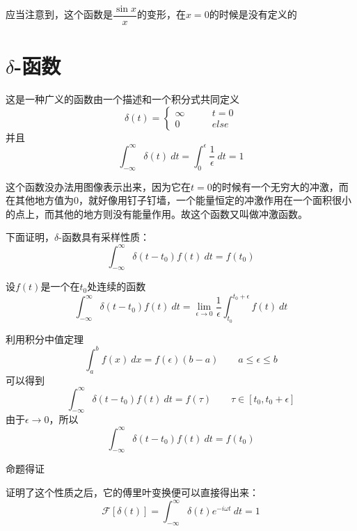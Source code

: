 \documentclass[UTF8]{ctexbook}
\begin{document}
			应当注意到，这个函数是$\dfrac{\sin x}{x}$的变形，在$x=0$的时候是没有定义的

		\section{$\delta$-函数}

			这是一种广义的函数由一个描述和一个积分式共同定义
			\begin{equation}
				\delta(t) = \left\{
				\begin{aligned}
				\infty & \qquad t=0\\
				0& \qquad else 
				\end{aligned}
				\right.
			\end{equation}
			并且
			\begin{equation}
				\int_{-\infty}^{\infty}\delta(t)\ dt=\int_{0}^{\epsilon}\dfrac{1}{\epsilon}\ dt=1
			\end{equation}

			这个函数没办法用图像表示出来，因为它在$t = 0$的时候有一个无穷大的冲激，而在其他地方值为0，就好像用钉子钉墙，一个能量恒定的冲激作用在一个面积很小的点上，而其他的地方则没有能量作用。故这个函数又叫做冲激函数。

			下面证明，$\delta$-函数具有采样性质：
			\begin{equation}
				\int_{-\infty}^{\infty}\delta(t-t_0)f(t)\ dt=f(t_0)
			\end{equation}

			设$f(t)$是一个在$t_0$处连续的函数
			\begin{equation}
				\int_{-\infty}^{\infty}\delta(t-t_0)f(t)\ dt = \lim_{\epsilon\to 0}\dfrac{1}{\epsilon}\int_{t_0}^{t_0+\epsilon}f(t)\ dt
			\end{equation}
			
			利用积分中值定理
			\begin{equation}
				\int_{a}^{b}f(x)\ dx = f(\epsilon) (b - a)\qquad a\leq\epsilon\leq b
			\end{equation}
			可以得到
			\begin{equation}
				\int_{-\infty}^{\infty}\delta(t-t_0)f(t)\ dt = f(\tau)\qquad \tau\in\left[t_0, t_0 + \epsilon\right]
			\end{equation}
			由于$\epsilon\to 0$，所以
			\begin{equation}
				\int_{-\infty}^{\infty}\delta(t-t_0)f(t)\ dt = f(t_0)
			\end{equation}
			
			命题得证

			证明了这个性质之后，它的傅里叶变换便可以直接得出来：
			\begin{equation}
				\mathscr{F}[\delta(t)]=\int_{-\infty}^{\infty}\delta(t)e^{-i\omega t}\ dt=1
			\end{equation}
\end{document}
